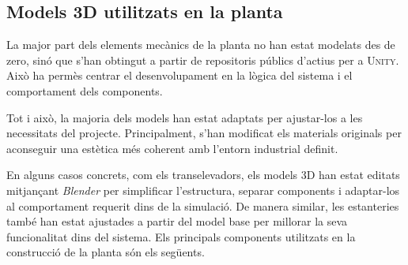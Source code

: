 \documentclass[a4paper,11pt,DIV=13,headings=normal,abstract=true,twoside=semi]{article}
\newcommand{\acro}[1]{\textsc{#1}}
\begin{document}
\subsection{Models 3D utilitzats en la planta}

La major part dels elements mecànics de la planta no han estat modelats des de zero, sinó que s'han obtingut a partir de repositoris públics d'actius per a \acro{Unity}. Això ha permès centrar el desenvolupament en la lògica del sistema i el comportament dels components.

Tot i això, la majoria dels models han estat adaptats per ajustar-los a les necessitats del projecte. Principalment, s'han modificat els materials originals per aconseguir una estètica més coherent amb l'entorn industrial definit.

En alguns casos concrets, com els transelevadors, els models 3D han estat editats mitjançant \emph{Blender} \cite{blender_download} per simplificar l'estructura, separar components i adaptar-los al comportament requerit dins de la simulació. De manera similar, les estanteries també han estat ajustades a partir del model base per millorar la seva funcionalitat dins del sistema. Els principals components utilitzats en la construcció de la planta són els següents. 
\end{document}
